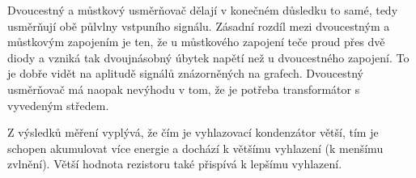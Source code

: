 \documentclass[12pt]{article} %
\begin{document}
Dvoucestný a můstkový usměrňovač dělají v konečném důsledku to samé, tedy usměrňují obě půlvlny vstpuního signálu. Zásadní rozdíl mezi dvoucestným a můstkovým zapojením je ten, že u můstkového zapojení teče proud přes dvě diody a vzniká tak dvoujnásobný úbytek napětí než u dvoucestného zapojení. To je dobře vidět na aplitudě signálů znázorněných na grafech. Dvoucestný usměrňovač má naopak nevýhodu v tom, že je potřeba transformátor s vyvedeným středem.

Z výsledků měření vyplývá, že čím je vyhlazovací kondenzátor větší, tím je schopen akumulovat více energie a dochází k většímu vyhlazení (k menšímu zvlnění). Větší hodnota rezistoru také přispívá k lepšímu vyhlazení.
\end{document}
